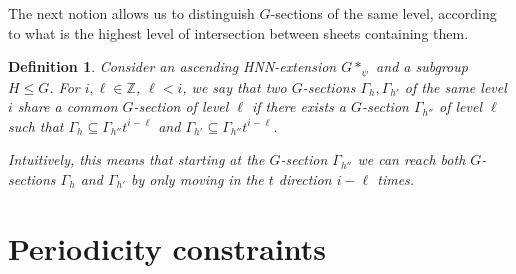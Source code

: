 \documentclass[cupthm,crop,info]{CUP-JNL-ETS}%
\theoremstyle{cupplain}
\theoremstyle{cupdefinition}
\newtheorem{definition}{Definition}[section]
\theoremstyle{cupremark}
\theoremstyle{cupproof}
\numberwithin{equation}{section}
\begin{document}
The next notion allows us to distinguish $G$-sections of the same level, according to what is the highest level of intersection between sheets containing them.

\begin{definition} Consider an ascending HNN-extension $G*_{\psi}$ and a subgroup $H\leqslant G$. For $i,\ell\in \mathbb{Z}$, $\ell < i$, we say that two $G$-sections $\Gamma_h, \Gamma_{h'}$ of the same level $i$ \textit{share a common $G$-section of level $\ell$} if there exists a $G$-section $\Gamma_{h''}$ of level $\ell$ such that $\Gamma_{h}\subseteq \Gamma_{h''}t^{i-\ell}$ and $\Gamma_{h'}\subseteq \Gamma_{h''}t^{i-\ell}$.

	Intuitively, this means that starting at the $G$-section $\Gamma_{h''}$ we can reach both $G$-sections $\Gamma_{h}$ and $\Gamma_{h'}$ by only moving in the $t$ direction $i-\ell$ times.
\end{definition}



\section{Periodicity constraints}\label{section:weak_periodicity}
\end{document}
